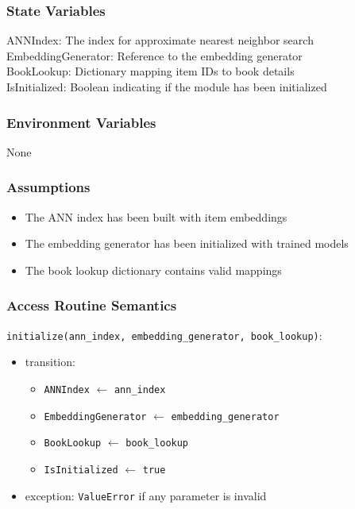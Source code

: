 \documentclass[12pt, titlepage]{article}
\begin{document}
\subsubsection{State Variables}
ANNIndex: The index for approximate nearest neighbor search\\
EmbeddingGenerator: Reference to the embedding generator\\
BookLookup: Dictionary mapping item IDs to book details\\
IsInitialized: Boolean indicating if the module has been initialized

\subsubsection{Environment Variables}

None

\subsubsection{Assumptions}

\begin{itemize}
  \item The ANN index has been built with item embeddings
  \item The embedding generator has been initialized with trained models
  \item The book lookup dictionary contains valid mappings
\end{itemize}

\subsubsection{Access Routine Semantics}

\noindent \texttt{initialize(ann\_index, embedding\_generator, book\_lookup)}:
\begin{itemize}
  \item transition:
  \begin{itemize}
    \item \texttt{ANNIndex} $\leftarrow$ \texttt{ann\_index}
    \item \texttt{EmbeddingGenerator} $\leftarrow$ \texttt{embedding\_generator}
    \item \texttt{BookLookup} $\leftarrow$ \texttt{book\_lookup}
    \item \texttt{IsInitialized} $\leftarrow$ \texttt{true}
  \end{itemize}
  \item exception: \texttt{ValueError} if any parameter is invalid
\end{itemize}
\end{document}
